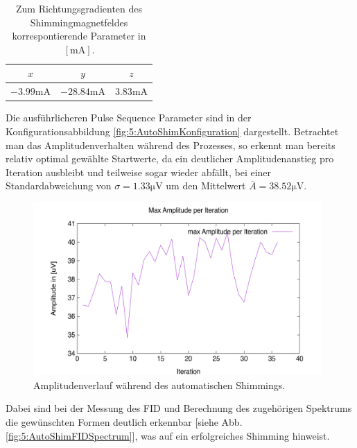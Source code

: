 \documentclass{article}
\begin{document}
            \begin{table}[H]
                \centering
                \begin{tabular}{|c|c|c|}
                    \hline
                    $x$ & $y$ & $z$ \\
                    \hline\hline
                    $-3.99\si{\milli\ampere}$ & $-28.84\si{\milli\ampere}$ & $3.83\si{\milli\ampere}$
                    \\\hline
                \end{tabular}
                \caption{Zum Richtungsgradienten des Shimmingmagnetfeldes korrespontierende Parameter in $[\si{\milli\ampere}]$.}
                \label{tab:5:AutoShimParameter}
            \end{table}
            Die ausführlicheren Pulse Sequence Parameter sind in der Konfigurationsabbildung \ref{fig:5:AutoShimKonfiguration} dargestellt. Betrachtet man das Amplitudenverhalten während des Prozesses, so erkennt man bereits relativ optimal gewählte Startwerte, da ein deutlicher Amplitudenanstieg pro Iteration ausbleibt und teilweise sogar wieder abfällt, bei einer Standardabweichung von $\sigma = 1.33\si{\micro\volt}$ um den Mittelwert $\overline A = 38.52\si{\micro\volt}$. 
            \begin{figure}[H]
                \centering
                \includegraphics[width=11cm]{../Bilddateien/AutoShim2_Iteration.png}
                \caption{Amplitudenverlauf während des automatischen Shimmings.}
                \label{fig:5:AutoShimAmplitudenverlauf}
            \end{figure}
            Dabei sind bei der Messung des FID und Berechnung des zugehörigen Spektrums die gewünschten Formen deutlich erkennbar [siehe Abb. \ref{fig:5:AutoShimFIDSpectrum}], was auf ein erfolgreiches Shimming hinweist.
\end{document}
